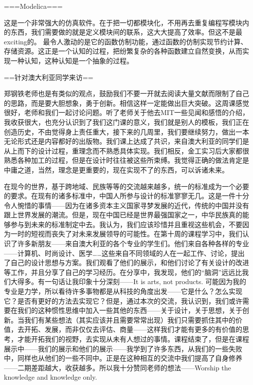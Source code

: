 \documentclass[11pt,fleqn]{book}
\numberwithin{dummy}{section}
\theoremstyle{ocrenumbox}
\theoremstyle{blacknumex}
\theoremstyle{blacknumbox}
\theoremstyle{ocrenum}
\newenvironment{remark}[1]{\par\vspace{10pt}\small %
	\begin{list}{}{
			\leftmargin=35pt %
			\rightmargin=25pt}\item\ignorespaces %
		\makebox[-2.5pt]{\begin{tikzpicture}[overlay]
			\node[draw=ocre!60,line width=1pt,circle,fill=ocre!25,font=\sffamily\bfseries,inner sep=2pt,outer sep=0pt] at (-15pt,0pt){\textcolor{ocre}{#1}};\end{tikzpicture}} %
		\advance\baselineskip -1pt}{\end{list}\vskip5pt} %
\newlength\esp
\begin{document}
\begin{remark}{黄}
===Modelica===

这是一个非常强大的仿真软件。在于把一切都模块化，不用再去重复编程写模块内的东西，我们需要做的就是定义模块间的联系，这大大提高了效率。但这不是最exciting的。
最令人激动的是它的函数仿制功能，通过函数的仿制实现节约计算、存储资源。这正是一个认知的过程，把纷繁复杂的各种函数建立自然变换，从而实现一种认知，这种认知是一个抽象的过程。

==针对澳大利亚同学来访==

	郑钢铁老师也是有类似的观点，鼓励我们不要一开就去阅读大量文献而限制了自己的思路，而是要大胆想象，勇于创新。相信这样一定能做出巨大突破。这周课感觉很好，老师和我们一起讨论问题。听了老师关于他去MIT一些见闻和感悟的介绍，我收获很大，也充分认识到了我们这门课的意义，我们就是别人的模板，我们正在创造历史，不由觉得身上责任重大，接下来的几周里，我们要继续努力，做出一本无论形式还是内容都好的出版物。我们课上达成了共识，来自澳大利亚的同学们是从上而下的设计过程，重理念而不熟悉具体实现。我们相反，金工实习后大家都很熟悉各种加工的过程，但是在设计时往往被这些所束缚。我觉得正确的做法肯定是中庸之道，当然，理念是更重要的，现在实现不了的东西，可以诉诸未来。
\end{remark}

\begin{remark}{康}
	在现今的世界，基于跨地域、民族等等的交流越来越多，统一的标准成为一个必要的要求。在现有的诸多标准中，中国人所参与设计的标准寥寥无几。这是一件十分令人惋惜的事情——因为在诸多资本主义国家寻梦发展的近代，传统的中国并没有跟上世界发展的潮流。但是，现在中国已经是世界最强国家之一，中华民族真的能够参与到未来的标准制定中去。我认为，我们应该珍惜并且重视这些机会，不要因为一时的短视而丧失了对未来发展领导的可能性。在第十周的课程学习中，我们认识了许多新朋友——来自澳大利亚的各个专业的学生们。他们来自各种各样的专业——计算机、时尚设计、医学……这些来自不同领域的人在一起工作、讨论，提出了自己的设计思想与方案。我们观看了他们的展示，和他们讨论了有关设计的改进等工作，并且分享了自己的学习经历。在分享中，我发现，他们的“脑洞”远远比我们大得多。有一句话让我印象十分深刻——It is arts, not products. 可能因为我的专业是力学，所以看待许多事物都是从科技的角度出发——它是什么？怎么实现它？是否有更好的方法去实现它？但是，通过本次的交流，我认识到，我们或许需要在我们的这种惯性思维中加入一些其他的东西——关于设计，关于思想，关于创新。当我们有某些想法（其实应该并且需要常常出现）我们只需要抓住其中的价值，去开拓、发展，而非仅仅去评估、商量——这样我们才能有更多的有价值的思考，才能开拓我们的视野，去实现从未有人想过的事情。课程结束了，但是在课程展示中——我们的展示和他们的展示——我学到了许多东西，从我们的一些失败中，同样也从他们的一些不同中。正是在这种相互的交流中我们提高了自身修养——二期差距越大，收获越多。所以我十分赞同老师的想法——Worship the knowledge and knowledge only.
\end{remark}
\end{document}
